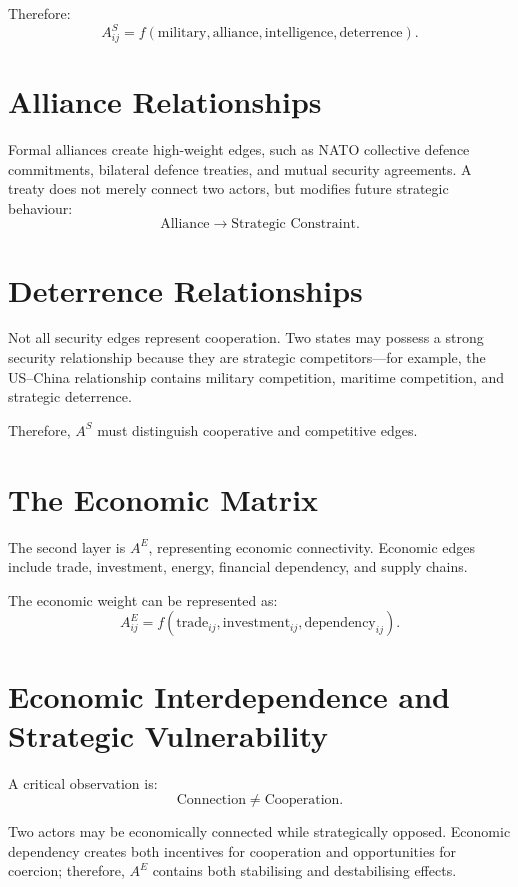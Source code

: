 \documentclass[11pt,openany]{book}
\theoremstyle{plain}
\theoremstyle{definition}
\begin{document}
Therefore:
\[
A^S_{ij} = f(\text{military}, \text{alliance}, \text{intelligence}, \text{deterrence}).
\]

\section*{Alliance Relationships}

Formal alliances create high-weight edges, such as NATO collective defence commitments, bilateral defence treaties, and mutual security agreements. A treaty does not merely connect two actors, but modifies future strategic behaviour:
\[
\text{Alliance}
\longrightarrow
\text{Strategic Constraint}.
\]

\section*{Deterrence Relationships}

Not all security edges represent cooperation. Two states may possess a strong security relationship because they are strategic competitors—for example, the US–China relationship contains military competition, maritime competition, and strategic deterrence. 

Therefore, \(A^S\) must distinguish cooperative and competitive edges.

\section*{The Economic Matrix}

The second layer is \(A^E\), representing economic connectivity. Economic edges include trade, investment, energy, financial dependency, and supply chains. 

The economic weight can be represented as:
\[
A^E_{ij} = f(\text{trade}_{ij}, \text{investment}_{ij}, \text{dependency}_{ij}).
\]

\section*{Economic Interdependence and Strategic Vulnerability}

A critical observation is:
\[
\text{Connection} \neq \text{Cooperation}.
\]

Two actors may be economically connected while strategically opposed. Economic dependency creates both incentives for cooperation and opportunities for coercion; therefore, \(A^E\) contains both stabilising and destabilising effects.
\end{document}
